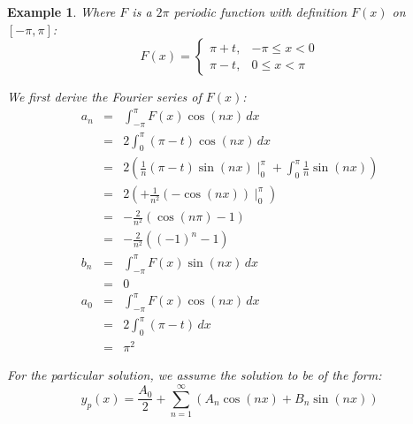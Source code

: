 \documentclass{article}
\newtheorem{example}{Example}[section]
\begin{document}
\begin{enumerate}
\begin{example}
              Where $F$ is a $2 \pi$ periodic function with definition $F(x)$ on $[- \pi, \pi]$:
              \begin{equation}
                  F(x) = \begin{cases}
                      \pi + t, & -\pi \leq x < 0 \\
                      \pi - t, & 0 \leq x < \pi
                  \end{cases}
              \end{equation}

              We first derive the Fourier series of $F(x)$:
              \begin{eqnarray}
                  a_{n} &=& \int_{-\pi}^{\pi} F(x) \cos(nx) \, dx \\
                  &=& 2 \int_{0}^{\pi} (\pi - t) \cos(nx) \, dx \\
                  &=& 2\left(
                  \frac{1}{n}(\pi - t) \sin(nx) \mid_{0}^{\pi}
                  +\int_{0}^{\pi} \frac{1}{n}\sin(nx)
                  \right) \\
                  &=& 2\left(
                  +\frac{1}{n^2}(-\cos(nx)) \mid_{0}^{\pi}
                  \right) \\
                  &=& -\frac{2}{n^2}\left(
                  \cos(n\pi) - 1
                  \right) \\
                  &=& -\frac{2}{n^2}\left(
                  (-1)^n - 1
                  \right) \\
                  b_n &=& \int_{-\pi}^{\pi} F(x) \sin(nx) \, dx \\
                  &=& 0 \\
                  a_{0} &=& \int_{-\pi}^{\pi} F(x) \cos(nx) \, dx \\
                  &=& 2 \int_{0}^{\pi} (\pi - t) \, dx \\
                  &=& \pi^2
              \end{eqnarray}

              For the particular solution, we assume the solution to be of the form:
              \begin{equation}
                  y_p(x) = \frac{A_{0}}{2} + \sum_{n=1}^{\infty}\left(
                  A_{n} \cos(nx) + B_{n} \sin(nx)
                  \right)
              \end{equation}


\end{example}
\end{enumerate}
\end{document}
